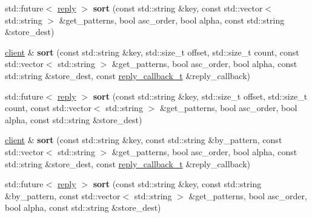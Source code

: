 \begin{DoxyCompactItemize}
\item 
\mbox{\label{classcpp__redis_1_1client_a0c2af4e5e21c67a104473c9e9032433c}} 
std\+::future$<$ \mbox{\hyperlink{classcpp__redis_1_1reply}{reply}} $>$ {\bfseries sort} (const std\+::string \&key, const std\+::vector$<$ std\+::string $>$ \&get\+\_\+patterns, bool asc\+\_\+order, bool alpha, const std\+::string \&store\+\_\+dest)
\item 
\mbox{\label{classcpp__redis_1_1client_aa60a5fe91d29d4399dfbea43eb039d67}} 
\mbox{\hyperlink{classcpp__redis_1_1client}{client}} \& {\bfseries sort} (const std\+::string \&key, std\+::size\+\_\+t offset, std\+::size\+\_\+t count, const std\+::vector$<$ std\+::string $>$ \&get\+\_\+patterns, bool asc\+\_\+order, bool alpha, const std\+::string \&store\+\_\+dest, const \mbox{\hyperlink{classcpp__redis_1_1client_af7a65eb21aa25230bfbb0b0203c4fc04}{reply\+\_\+callback\+\_\+t}} \&reply\+\_\+callback)
\item 
\mbox{\label{classcpp__redis_1_1client_a562cbda21fed71475dcd49736aaf2d4d}} 
std\+::future$<$ \mbox{\hyperlink{classcpp__redis_1_1reply}{reply}} $>$ {\bfseries sort} (const std\+::string \&key, std\+::size\+\_\+t offset, std\+::size\+\_\+t count, const std\+::vector$<$ std\+::string $>$ \&get\+\_\+patterns, bool asc\+\_\+order, bool alpha, const std\+::string \&store\+\_\+dest)
\item 
\mbox{\label{classcpp__redis_1_1client_aa91b9a98ca759b399fb0b44f2c08ac1c}} 
\mbox{\hyperlink{classcpp__redis_1_1client}{client}} \& {\bfseries sort} (const std\+::string \&key, const std\+::string \&by\+\_\+pattern, const std\+::vector$<$ std\+::string $>$ \&get\+\_\+patterns, bool asc\+\_\+order, bool alpha, const std\+::string \&store\+\_\+dest, const \mbox{\hyperlink{classcpp__redis_1_1client_af7a65eb21aa25230bfbb0b0203c4fc04}{reply\+\_\+callback\+\_\+t}} \&reply\+\_\+callback)
\item 
\mbox{\label{classcpp__redis_1_1client_aa4b367d9b16d363883ee68f56b1b3763}} 
std\+::future$<$ \mbox{\hyperlink{classcpp__redis_1_1reply}{reply}} $>$ {\bfseries sort} (const std\+::string \&key, const std\+::string \&by\+\_\+pattern, const std\+::vector$<$ std\+::string $>$ \&get\+\_\+patterns, bool asc\+\_\+order, bool alpha, const std\+::string \&store\+\_\+dest)

\end{DoxyCompactItemize}
